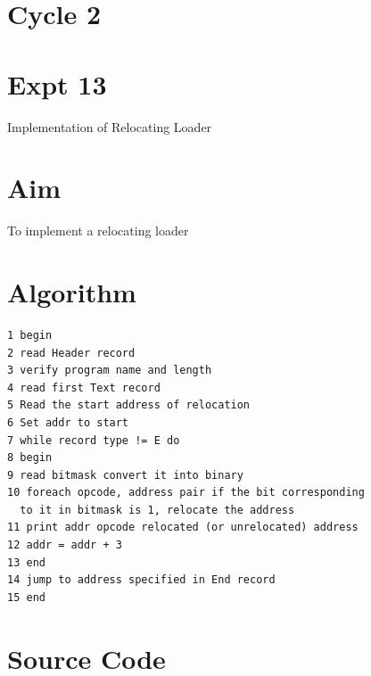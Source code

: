 \documentclass[13pt,oneside]{book}
\begin{document}
\section*{Cycle 2}
\section*{Expt 13}
\begin{center}
    \Large{Implementation of Relocating Loader}
\end{center}
\section*{Aim}
\large
To implement a relocating loader

\section*{Algorithm} 
    \begin{verbatim}
1 begin
2 read Header record
3 verify program name and length
4 read first Text record
5 Read the start address of relocation
6 Set addr to start
7 while record type != E do
8 begin
9 read bitmask convert it into binary
10 foreach opcode, address pair if the bit corresponding
  to it in bitmask is 1, relocate the address
11 print addr opcode relocated (or unrelocated) address
12 addr = addr + 3
13 end
14 jump to address specified in End record
15 end
	\end{verbatim}

\section*{Source Code}
\small
\end{document}
